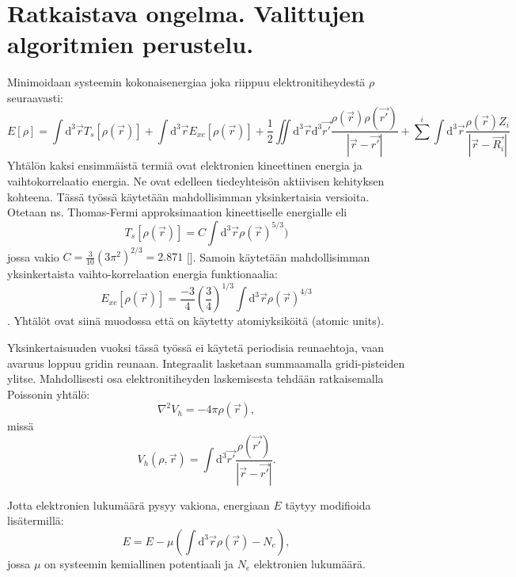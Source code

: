\documentclass{article}
\begin{document}
\section{Ratkaistava ongelma. Valittujen algoritmien perustelu.}
Minimoidaan systeemin kokonaisenergiaa joka riippuu elektronitiheydestä $\rho$ seuraavasti:
\begin{equation}
E[\rho] = 
\int \mathrm{d}^3\vec{r} T_s[\rho(\vec{r})] + 
\int \mathrm{d}^3\vec{r} E_{xc}[\rho(\vec{r})] + 
\frac{1}{2} \iint \mathrm{d}^3\vec{r}\mathrm{d}^3\vec{r'}
\frac{\rho(\vec{r}) \rho(\vec{r'})}{|\vec{r}-\vec{r'}|} +
\sum^i \int \mathrm{d}^3\vec{r} 
\frac{\rho(\vec{r}) Z_i }{|\vec{r}-\vec{R_i}|} 
\end{equation}
Yhtälön kaksi ensimmäistä termiä ovat elektronien kineettinen energia
ja vaihtokorrelaatio energia. Ne ovat edelleen tiedeyhteisön
aktiivisen kehityksen kohteena. Tässä työssä käytetään mahdollisimman
yksinkertaisia versioita. Otetaan ns. Thomas-Fermi approksimaation
kineettiselle energialle eli
\begin{equation}
T_s[\rho(\vec{r})] = C \int \mathrm{d}^3\vec{r} \rho(\vec{r})^{5/3})
\end{equation}
jossa vakio $C=\frac{3}{10}(3\pi^2)^{2/3} = 2.871$
[\cite{march1957thomas}].  Samoin käytetään mahdollisimman
yksinkertaista vaihto-korrelaation energia funktionaalia:
\begin{equation}
E_{xc}[\rho(\vec{r})] = \frac{-3}{4}(\frac{3}{4})^{1/3}\int
\mathrm{d}^3\vec{r} \rho(\vec{r})^{4/3}
\end{equation}.
Yhtälöt ovat siinä muodossa että on käytetty atomiyksiköitä (atomic
units).

Yksinkertaisuuden vuoksi tässä työssä ei käytetä periodisia
reunaehtoja, vaan avaruus loppuu gridin reunaan. Integraalit lasketaan summaamalla gridi-pisteiden ylitse. Mahdollisesti osa elektronitiheyden laskemisesta tehdään ratkaisemalla Poissonin yhtälö:
\begin{equation}
\label{poisson}
\nabla^2 V_h = -4 \pi \rho(\vec{r}),
\end{equation}
missä
\begin{equation}
V_h (\rho, \vec{r}) = \int \mathrm{d}^3\vec{r'} 
\frac{\rho(\vec{r'}) }{|\vec{r}-\vec{r'}|}.
\end{equation}

Jotta elektronien lukumäärä pysyy vakiona, energiaan $E$ täytyy
modifioida lisätermillä:
\begin{equation}
E=E-\mu (\int \mathrm{d}^3\vec{r}\rho(\vec{r})-N_e),
\end{equation}
jossa $\mu$ on systeemin kemiallinen potentiaali ja 
$N_e$ elektronien lukumäärä.
\end{document}
